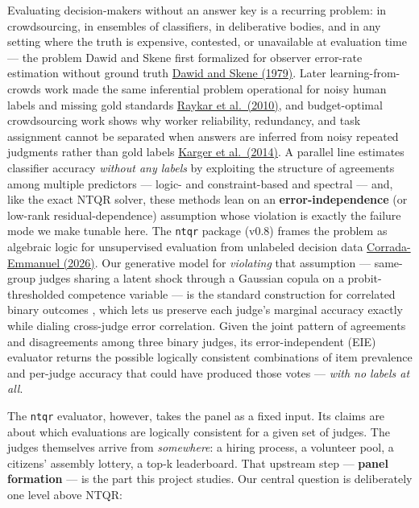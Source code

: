 \documentclass[
]{article}
\begin{document}
Evaluating decision-makers without an answer key is a recurring problem:
in crowdsourcing, in ensembles of classifiers, in deliberative bodies,
and in any setting where the truth is expensive, contested, or
unavailable at evaluation time --- the problem Dawid and Skene first
formalized for observer error-rate estimation without ground truth
\href{https://doi.org/10.2307/2346806}{Dawid and Skene (1979)}. Later
learning-from-crowds work made the same inferential problem operational
for noisy human labels and missing gold standards
\href{https://jmlr.org/papers/v11/raykar10a.html}{Raykar et al.~(2010)},
and budget-optimal crowdsourcing work shows why worker reliability,
redundancy, and task assignment cannot be separated when answers are
inferred from noisy repeated judgments rather than gold labels
\href{https://doi.org/10.1287/opre.2013.1235}{Karger et al.~(2014)}. A
parallel line estimates classifier accuracy \emph{without any labels} by
exploiting the structure of agreements among multiple predictors ---
logic- and constraint-based \citep{platanios2014} and spectral
\citep{parisi2014} --- and, like the exact NTQR solver, these methods
lean on an \textbf{error-independence} (or low-rank residual-dependence)
assumption whose violation is exactly the failure mode we make tunable
here. The \texttt{ntqr} package (v0.8) frames the problem as algebraic
logic for unsupervised evaluation from unlabeled decision data
\href{https://pypi.org/project/ntqr/}{Corrada-Emmanuel (2026)}. Our
generative model for \emph{violating} that assumption --- same-group
judges sharing a latent shock through a Gaussian copula on a
probit-thresholded competence variable --- is the standard construction
for correlated binary outcomes \citep{emrich1991, nelsen2006}, which
lets us preserve each judge's marginal accuracy exactly while dialing
cross-judge error correlation. Given the joint pattern of agreements and
disagreements among three binary judges, its error-independent (EIE)
evaluator returns the possible logically consistent combinations of item
prevalence and per-judge accuracy that could have produced those votes
--- \emph{with no labels at all}.

The \texttt{ntqr} evaluator, however, takes the panel as a fixed input.
Its claims are about which evaluations are logically consistent for a
given set of judges. The judges themselves arrive from \emph{somewhere}:
a hiring process, a volunteer pool, a citizens' assembly lottery, a
top-k leaderboard. That upstream step --- \textbf{panel formation} ---
is the part this project studies. Our central question is deliberately
one level above NTQR:
\end{document}
